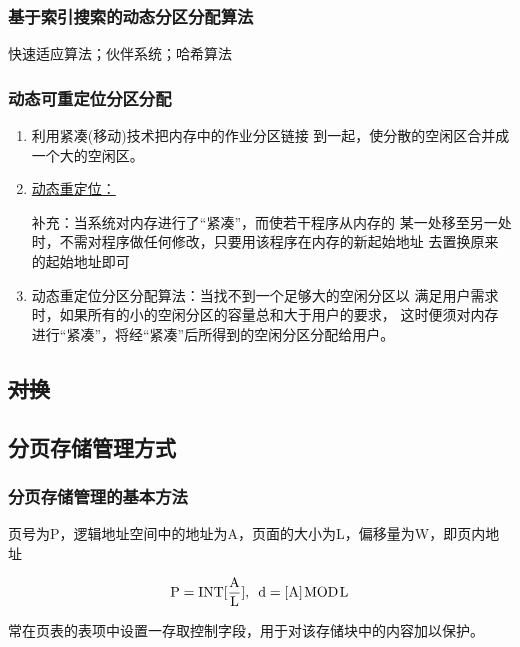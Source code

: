 \documentclass{article}
\begin{document}
\subsubsection{基于索引搜索的动态分区分配算法}
 快速适应算法；伙伴系统；哈希算法
\vspace*{-0.4cm}
\subsubsection{\color{red}动态可重定位分区分配}
\begin{enumerate}
    \item 利用紧凑(移动)技术把内存中的作业分区链接
    到一起，使分散的空闲区合并成一个大的空闲区。
    \item \hyperref[动态重定位]{动态重定位：}
    
    补充：当系统对内存进行了“紧凑”，而使若干程序从内存的
    某一处移至另一处时，不需对程序做任何修改，只要用该程序在内存的新起始地址
    去置换原来的起始地址即可
    \item 动态重定位分区分配算法：当找不到一个足够大的空闲分区以
    满足用户需求时，如果所有的小的空闲分区的容量总和大于用户的要求，
    这时便须对内存进行“紧凑”，将经“紧凑”后所得到的空闲分区分配给用户。
\end{enumerate}
\vspace*{-0.8cm}
\subsection{\sout{对换}}
\clearpage
\subsection{分页存储管理方式}
\subsubsection{分页存储管理的基本方法}
页号为P，逻辑地址空间中的地址为A，页面的大小为L，偏移量为W，即页内地址

\[\text{P}=\text{INT}[\frac{\text{A}}{\text{L}}],\hspace*{5pt} \text{d}=[\text{A}]\hspace*{1pt}\text{MOD}\hspace*{1pt}\text{L}\]

常在页表的表项中设置一存取控制字段，用于对该存储块中的内容加以保护。
\end{document}
